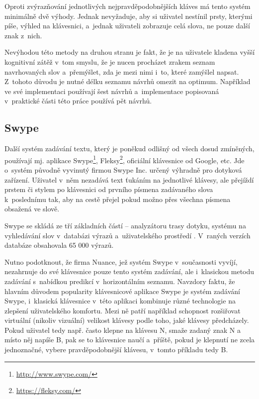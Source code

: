 \documentclass[a4paper,11pt,openany]{book} %
\newcommand\exmp{\textsf}
\begin{document}
Oproti zvýrazňování jednotlivých nejpravděpodobnějších kláves má tento systém minimálně dvě výhody. Jednak nevyžaduje, aby si uživatel nestínil prsty, kterými píše, výhled na klávesnici, a~jednak uživateli zobrazuje celá slova, ne pouze další znak z~nich.

Nevýhodou této metody na druhou stranu je fakt, že je na uživatele kladena vyšší kognitivní zátěž v~tom smyslu, že je nucen procházet zrakem seznam navrhovaných slov a~přemýšlet, zda je mezi nimi i~to, které zamýšlel napsat. Z~tohoto důvodu je nutné délku seznamu návrhů omezit na optimum. Například \textcite{neverilovaulipova2014} ve své implementaci používají šest návrhů a~implementace popisovaná v~praktické části této práce používá pět návrhů.

\subsection{Swype}

Další systém zadávání textu, který je poněkud odlišný od všech dosud zmíněných, používají mj. aplikace Swype\footnote{\url{http://www.swype.com/}}, Fleksy\footnote{\url{https://fleksy.com/}}, oficiální klávesnice od Google, etc. Jde o~systém původně vyvinutý firmou Swype Inc. určený výhradně pro dotyková zařízení. Uživatel v~něm nezadává text ťukáním na jednotlivé klávesy, ale přejíždí prstem či stylem po klávesnici od prvního písmena zadávaného slova k~poslednímu tak, aby na cestě přejel pokud možno přes všechna písmena obsažená ve slově. \parencite{swypeabout} %

Swype se skládá ze tří základních částí -- analyzátoru trasy dotyku, systému na vyhledávání slov v~databázi výrazů a~uživatelského prostředí \parencite{kushler2006system}. V~raných verzích databáze obsahovala 65 000 výrazů. \parencite{rafeneedleman2008} %

Nutno podotknout, že firma Nuance, jež systém Swype v~současnosti vyvíjí, nezahrnuje do své klávesnice pouze tento systém zadávání, ale i~klasickou metodu zadávání s~nabídkou predikcí v~horizontálním seznamu. Navzdory faktu, že hlavním důvodem popularity klávesnicové aplikace Swype je systém zadávání Swype, i~klasická klávesnice v~této aplikaci kombinuje různé technologie na zlepšení uživatelského komfortu. Mezi ně patří například schopnost rozšiřovat virtuální (nikoliv vizuální) velikost klávesy podle toho, jaké klávesy předcházely. Pokud uživatel tedy např. často klepne na klávesu \exmp{N}, smaže zadaný znak \exmp{N} a místo něj napíše \exmp{B}, pak se to klávesnice naučí a~příště, pokud je klepnutí ne zcela jednoznačné, vybere pravděpodobnější klávesu, v~tomto příkladu tedy \exmp{B}. \parencite{swypeabout} %
\end{document}
